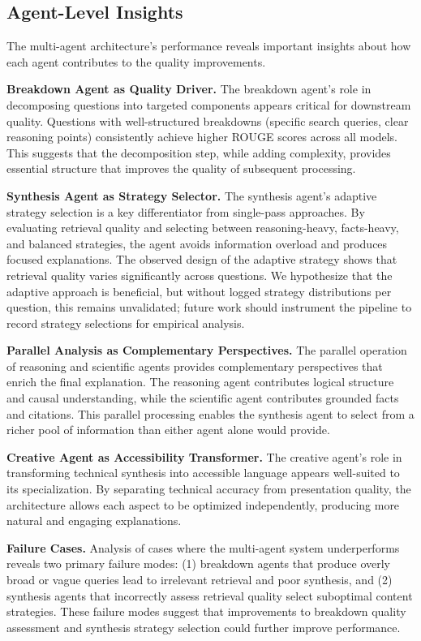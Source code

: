 \subsection{Agent-Level Insights}

The multi-agent architecture's performance reveals important insights about how each agent contributes to the quality improvements.

\textbf{Breakdown Agent as Quality Driver.} The breakdown agent's role in decomposing questions into targeted components appears critical for downstream quality. Questions with well-structured breakdowns (specific search queries, clear reasoning points) consistently achieve higher ROUGE scores across all models. This suggests that the decomposition step, while adding complexity, provides essential structure that improves the quality of subsequent processing.

\textbf{Synthesis Agent as Strategy Selector.} The synthesis agent's adaptive strategy selection is a key differentiator from single-pass approaches. By evaluating retrieval quality and selecting between reasoning-heavy, facts-heavy, and balanced strategies, the agent avoids information overload and produces focused explanations. The observed design of the adaptive strategy shows that retrieval quality varies significantly across questions. We hypothesize that the adaptive approach is beneficial, but without logged strategy distributions per question, this remains unvalidated; future work should instrument the pipeline to record strategy selections for empirical analysis.

\textbf{Parallel Analysis as Complementary Perspectives.} The parallel operation of reasoning and scientific agents provides complementary perspectives that enrich the final explanation. The reasoning agent contributes logical structure and causal understanding, while the scientific agent contributes grounded facts and citations. This parallel processing enables the synthesis agent to select from a richer pool of information than either agent alone would provide.

\textbf{Creative Agent as Accessibility Transformer.} The creative agent's role in transforming technical synthesis into accessible language appears well-suited to its specialization. By separating technical accuracy from presentation quality, the architecture allows each aspect to be optimized independently, producing more natural and engaging explanations.

\textbf{Failure Cases.} Analysis of cases where the multi-agent system underperforms reveals two primary failure modes: (1) breakdown agents that produce overly broad or vague queries lead to irrelevant retrieval and poor synthesis, and (2) synthesis agents that incorrectly assess retrieval quality select suboptimal content strategies. These failure modes suggest that improvements to breakdown quality assessment and synthesis strategy selection could further improve performance.

